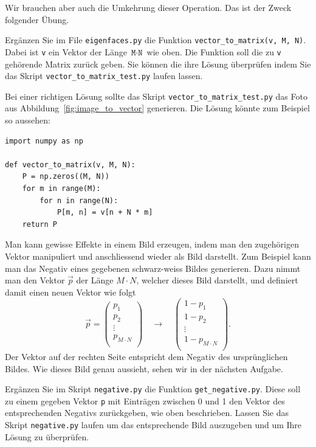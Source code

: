 Wir brauchen aber auch die Umkehrung dieser Operation.
Das ist der Zweck folgender Übung.
\begin{aufgabe} \label{aufg:vectormatrix_code}
	Ergänzen Sie im File \texttt{eigenfaces.py} die Funktion \texttt{vector\_to\_matrix(v, M, N)}.
	Dabei ist \texttt{v} ein Vektor der Länge $\texttt{M}\cdot\texttt{N}$ wie oben.
	Die Funktion soll die zu \texttt{v} gehörende Matrix zurück geben.
	Sie können die ihre Lösung überprüfen indem Sie das Skript \texttt{vector\_to\_matrix\_test.py} laufen lassen.
\end{aufgabe}
\begin{losung}
	Bei einer richtigen Lösung sollte das Skript \texttt{vector\_to\_matrix\_test.py} das Foto aus Abbildung~\ref{fig:image_to_vector} generieren.
	Die Lösung könnte zum Beispiel so aussehen:
\begin{lstlisting}[style=python]
import numpy as np

def vector_to_matrix(v, M, N):
	P = np.zeros((M, N))
	for m in range(M):
		for n in range(N):
			P[m, n] = v[n + N * m]
	return P
\end{lstlisting}
\end{losung}
Man kann gewisse Effekte in einem Bild erzeugen, indem man den zugehörigen Vektor manipuliert und anschliessend wieder als Bild darstellt.
Zum Beispiel kann man das Negativ eines gegebenen schwarz-weiss Bildes generieren.
Dazu nimmt man den Vektor $\vec p$ der Länge $M\cdot N$, welcher dieses Bild darstellt, und definiert damit einen neuen Vektor wie folgt
\begin{equation*}
	\vec p=
	\begin{pmatrix}
		p_1 \\ p_2 \\ \vdots \\ p_{M\cdot N} \\
	\end{pmatrix}
	\quad\longrightarrow\quad
	\begin{pmatrix}
		1-p_1 \\ 1-p_2 \\ \vdots \\ 1-p_{M\cdot N} \\
	\end{pmatrix}.
\end{equation*}
Der Vektor auf der rechten Seite entspricht dem Negativ des ursprünglichen Bildes.
Wie dieses Bild genau aussieht, sehen wir in der nächsten Aufgabe.
\begin{aufgabe} \label{aufg:negative}
	Ergänzen Sie im Skript \texttt{negative.py} die Funktion \texttt{get\_negative.py}.
	Diese soll zu einem gegeben Vektor \texttt{p} mit Einträgen zwischen 0 und 1 den Vektor des entsprechenden Negativs zurückgeben, wie oben beschrieben.
	Lassen Sie das Skript \texttt{negative.py} laufen um das entsprechende Bild auszugeben und um Ihre Lösung zu überprüfen.
\end{aufgabe}
